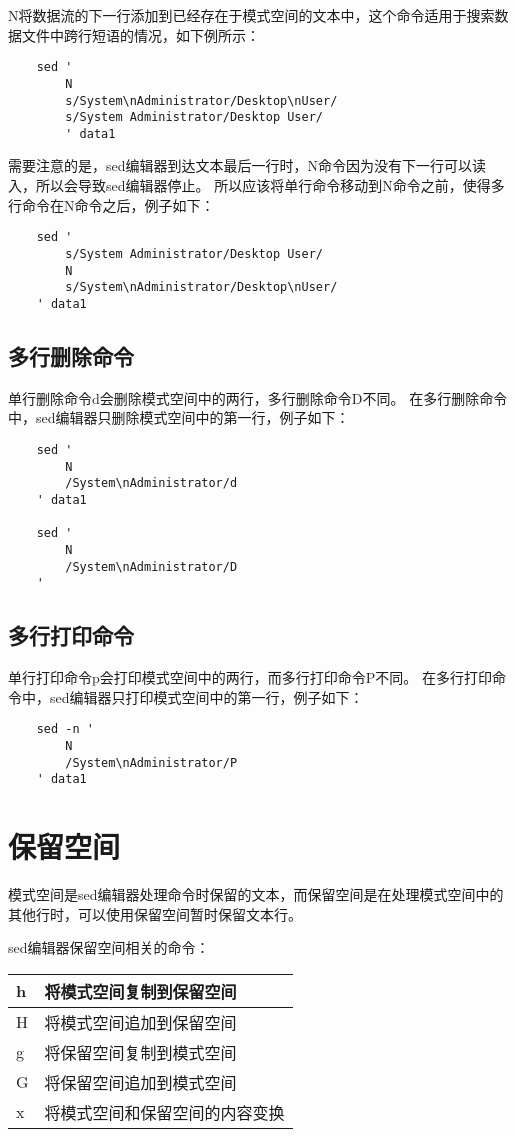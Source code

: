 \documentclass[a4paper,left=2.5cm,right=2.5cm,11pt]{article}
\begin{document}
	N将数据流的下一行添加到已经存在于模式空间的文本中，这个命令适用于搜索数据文件中跨行短语的情况，如下例所示：
	\begin{lstlisting}
	sed '
		N
		s/System\nAdministrator/Desktop\nUser/
		s/System Administrator/Desktop User/
		' data1
	\end{lstlisting}

	需要注意的是，sed编辑器到达文本最后一行时，N命令因为没有下一行可以读入，所以会导致sed编辑器停止。
	所以应该将单行命令移动到N命令之前，使得多行命令在N命令之后，例子如下：
	\begin{lstlisting}
	sed '
		s/System Administrator/Desktop User/
		N
		s/System\nAdministrator/Desktop\nUser/
	' data1
	\end{lstlisting}

\subsection{多行删除命令}
	单行删除命令d会删除模式空间中的两行，多行删除命令D不同。
	在多行删除命令中，sed编辑器只删除模式空间中的第一行，例子如下：
	\begin{lstlisting}
	sed '
		N
		/System\nAdministrator/d
	' data1

	sed '
		N
		/System\nAdministrator/D
	'
	\end{lstlisting}

\subsection{多行打印命令}
	单行打印命令p会打印模式空间中的两行，而多行打印命令P不同。
	在多行打印命令中，sed编辑器只打印模式空间中的第一行，例子如下：
	\begin{lstlisting}
	sed -n '
		N
		/System\nAdministrator/P
	' data1
	\end{lstlisting}

\section{保留空间}
	模式空间是sed编辑器处理命令时保留的文本，而保留空间是在处理模式空间中的其他行时，可以使用保留空间暂时保留文本行。\par

	sed编辑器保留空间相关的命令：
	\begin{longtable}{p{2cm}p{6cm}}
	\hline
	h & 将模式空间复制到保留空间 \\
	\hline
	H & 将模式空间追加到保留空间 \\
	\hline
	g & 将保留空间复制到模式空间 \\
	\hline
	G & 将保留空间追加到模式空间 \\
	\hline
	x & 将模式空间和保留空间的内容变换 \\
	\hline
	\end{longtable}
\end{document}
